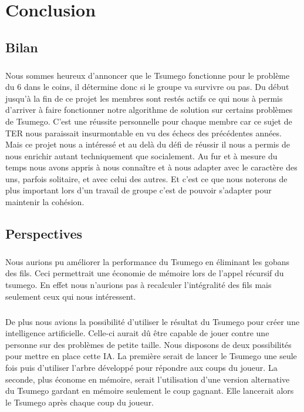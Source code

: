 \chapter{Conclusion}\label{chap:conclusion}
    \section{Bilan}
        \paragraph{}Nous sommes heureux d'annoncer que le Tsumego fonctionne pour le problème du 6 dans le coins, il détermine donc si le groupe va survivre ou pas. Du début jusqu'à la fin de ce projet les membres sont restés actifs ce qui nous à permis d'arriver à faire fonctionner notre algorithme de solution sur certains problèmes de Tsumego. C'est une réussite personnelle pour chaque membre car ce sujet de TER nous paraissait insurmontable en vu des échecs des précédentes années. Mais ce projet nous a intéressé et au delà du défi de réussir il nous a permis de nous enrichir autant techniquement que socialement. Au fur et à mesure du temps nous avons appris à nous connaître et à nous adapter avec le caractère des uns, parfois solitaire, et avec celui des autres. Et c'est ce que nous noterons de plus important lors d'un travail de groupe c'est de pouvoir s'adapter pour maintenir la cohésion.
            
    \section{Perspectives}
        \paragraph{}Nous aurions pu améliorer la performance du Tsumego en éliminant les gobans des fils. Ceci permettrait une économie de mémoire lors de l'appel récursif du tsumego. En effet nous n'aurions pas à recalculer l'intégralité des fils mais seulement ceux qui nous intéressent. 
        
        \paragraph{}De plus nous avions la possibilité d'utiliser le résultat du Tsumego pour créer une intelligence artificielle. Celle-ci aurait dû être capable de jouer contre une personne sur des problèmes de petite taille. Nous disposons de deux possibilités pour mettre en place cette IA. La première serait de lancer le Tsumego une seule fois puis d'utiliser l'arbre développé pour répondre aux coups du joueur. La seconde, plus économe en mémoire, serait l'utilisation d'une version alternative du Tsumego gardant en mémoire seulement le coup gagnant. Elle lancerait alors le Tsumego  après chaque coup du joueur.
        
